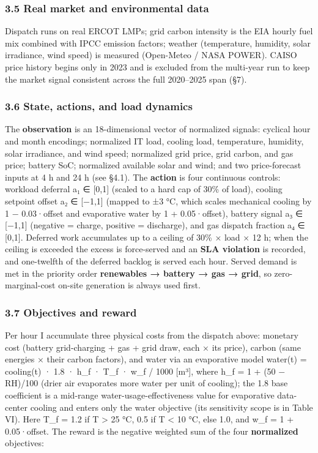 \documentclass[
  11pt,
]{article}
\begin{document}
\subsubsection{3.5 Real market and environmental
data}\label{real-market-and-environmental-data}

Dispatch runs on real ERCOT LMPs; grid carbon intensity is the EIA
hourly fuel mix combined with IPCC emission factors; weather
(temperature, humidity, solar irradiance, wind speed) is measured
(Open-Meteo / NASA POWER). CAISO price history begins only in 2023 and
is excluded from the multi-year run to keep the market signal consistent
across the full 2020--2025 span (§7).

\subsubsection{3.6 State, actions, and load
dynamics}\label{state-actions-and-load-dynamics}

The \textbf{observation} is an 18-dimensional vector of normalized
signals: cyclical hour and month encodings; normalized IT load, cooling
load, temperature, humidity, solar irradiance, and wind speed;
normalized grid price, grid carbon, and gas price; battery SoC;
normalized available solar and wind; and two price-forecast inputs at 4
h and 24 h (see §4.1). The \textbf{action} is four continuous controls:
workload deferral a₁ ∈ {[}0,1{]} (scaled to a hard cap of 30\% of load),
cooling setpoint offset a₂ ∈ {[}−1,1{]} (mapped to ±3 °C, which scales
mechanical cooling by 1 − 0.03·offset and evaporative water by 1 +
0.05·offset), battery signal a₃ ∈ {[}−1,1{]} (negative = charge,
positive = discharge), and gas dispatch fraction a₄ ∈ {[}0,1{]}.
Deferred work accumulates up to a ceiling of 30\% × load × 12 h; when
the ceiling is exceeded the excess is force-served and an \textbf{SLA
violation} is recorded, and one-twelfth of the deferred backlog is
served each hour. Served demand is met in the priority order
\textbf{renewables → battery → gas → grid}, so zero-marginal-cost
on-site generation is always used first.

\subsubsection{3.7 Objectives and reward}\label{objectives-and-reward}

Per hour I accumulate three physical costs from the dispatch above:
monetary cost (battery grid-charging + gas + grid draw, each × its
price), carbon (same energies × their carbon factors), and water via an
evaporative model water(t) = cooling(t) · 1.8 · h\_f · T\_f · w\_f /
1000 {[}m³{]}, where h\_f = 1 + (50 − RH)/100 (drier air evaporates more
water per unit of cooling); the 1.8 base coefficient is a mid-range
water-usage-effectiveness value for evaporative data-center cooling and
enters only the water objective (its sensitivity scope is in Table VI).
Here T\_f = 1.2 if T \textgreater{} 25 °C, 0.5 if T \textless{} 10 °C,
else 1.0, and w\_f = 1 + 0.05·offset. The reward is the negative
weighted sum of the four \textbf{normalized} objectives:
\end{document}
